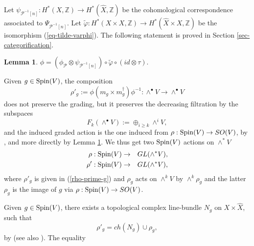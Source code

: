 \documentclass[12pt]{amsart}
\numberwithin{equation}{subsection}
\theoremstyle{plain}
\newtheorem{lem}[thm]{Lemma}
\theoremstyle{definition}
\newcommand{\ZZ}{{\mathbb Z}}
\renewcommand{\P}{{\mathcal P}}
\newcommand{\Spin}{{\rm Spin}}
\begin{document}
 Let $\psi_{\P^{-1}[n]}:H^*(X,\ZZ)\rightarrow H^*(\hat{X},\ZZ)$ be the cohomological correspondence associated to $\Psi_{\P^{-1}[n]}$. Let $\tilde{\varphi}:H^*(X\times X,\ZZ)\rightarrow H^*(\hat{X}\times X,\ZZ)$ be the isomorphism (\ref{eq-tilde-varphi}).
 The following statement is proved in Section \ref{sec-categorification}.
 
 \begin{lem}
 \label{lemma-orlov-isomorphism-is-chevalley}
 $\phi=(\phi_\P\otimes\psi_{\P^{-1}[n]})\circ \tilde{\varphi}\circ (id\otimes \tau).$ 
\end{lem}
 
 
 Given $g\in\Spin(V)$, the composition 
 \begin{equation}
 \label{rho-prime-g}
 \rho'_g:=\phi(m_g\times m^\dagger_g)\phi^{-1}:\wedge^\bullet V\rightarrow \wedge^\bullet V
 \end{equation}
 does not preserve the grading, but it preserves the decreasing filtration by the subspaces
 \begin{equation}
 \label{eq-decreasing-weight-filtration}
 F_k(\wedge^\bullet V):=\oplus_{i\geq k} \wedge^iV, 
 \end{equation}
 and the induced graded action is the one induced from $\rho:\Spin(V)\rightarrow SO(V)$, by 
 \cite[Prop. 4.3.7 and Cor. 4.3.8]{golyshev-luntz-orlov}, and
 more directly by Lemma \ref{lemma-orlov-isomorphism-is-chevalley}.
 We thus get two $\Spin(V)$ actions on
 $\wedge^*V$
 \begin{eqnarray}
 \label{eq-rho-extended-to-exterior-algebra}
 \rho : \Spin(V) & \rightarrow & GL(\wedge^*V),
 \\
\label{eq-rho-prime}
\rho' : \Spin(V) & \rightarrow & GL(\wedge^*V),
\end{eqnarray}
where $\rho'_g$ is given in (\ref{rho-prime-g}) and 
$\rho_g$ acts on $\wedge^kV$ by $\wedge^k\rho_g$ and the latter $\rho_g$ is the image of $g$ via $\rho:\Spin(V)\rightarrow SO(V)$.
 
Given $g\in \Spin(V)$, there exists a topological complex line-bundle $N_g$ on $X\times \hat{X}$, such that 
\begin{equation}
\label{eq-N-g}
\rho'_g=ch(N_g)\cup\rho_g,
\end{equation} 
by \cite[Theorem 2.10]{orlov-abelian-varieties} (see also \cite[Prop. 9.39]{huybrechts-derived-categories-book}).
The equality
\end{document}
